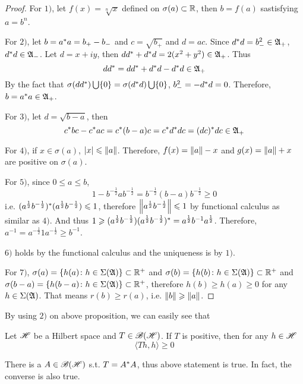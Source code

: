 \documentclass[a4paper,11pt]{report}
\begin{document}
\begin{proof}
	For $1)$, let $f(x)= \sqrt[n]{x}$ defined on $\sigma(a) \subset \mathbb{R}$, then $b=f(a)$ sastisfying $ a = b^{n}$.
	\item For $2)$, let $b = a^{*}a = b_{+} - b_{-}$ and $c = \sqrt{b_{+}}$  and $d=ac$. Since $d^{*}d = b_{-}^2 \in \mathfrak{A}_{+}$, $d^{*}d \in \mathfrak{A}_{-}$. Let $d = x + iy$, then $dd^{*} + d^{*}d = 2(x^2+y^2) \in \mathfrak{A}_{+}$. Thus
	\begin{equation*}
		dd^{*} = dd^{*} + d^{*}d -d^{*}d \in \mathfrak{A}_{+}
	\end{equation*}
	By the fact that $\sigma(dd^{*})\bigcup\{0\} = \sigma(d^{*}d)\bigcup\{0\}$, $b_{-}^2 = -d^{*}d =0$. Therefore, $b = a^{*}a \in \mathfrak{A}_{+}$.
	\item For $3)$, let $d = \sqrt{b-a}$, then 
	\begin{equation*}
		c^{*}bc - c^{*}ac = c^{*}(b-a)c = c^{*}d^{*}dc = (dc)^{*}dc \in \mathfrak{A}_{+}
 	\end{equation*}
 	\item For $4)$, if $x \in \sigma(a)$, $\left\lvert x\right\lvert \leqslant \left\lVert a\right\lVert$. Therefore, $f(x) = \left\lVert a\right\lVert-x$ and $g(x) = \left\lVert a\right\lVert+x$ are positive on $\sigma(a)$.
 	\item For $5)$, since $0 \leqslant a \leqslant b$,
 	\begin{equation*}
 		1-b^{-\frac{1}{2}}ab^{-\frac{1}{2}} = b^{-\frac{1}{2}}(b-a)b^{-\frac{1}{2}} \geqslant 0
 	\end{equation*}
 	i.e. $(a^{\frac{1}{2}} b^{-\frac{1}{2}})^{*}(a^{\frac{1}{2}} b^{-\frac{1}{2}}) \leqslant 1$, therefore $\left\lVert a^{\frac{1}{2}} b^{-\frac{1}{2}}\right\lVert \leqslant 1$ by functional calculus as similar as $4)$. And thus $1 \geqslant (a^{\frac{1}{2}} b^{-\frac{1}{2}})(a^{\frac{1}{2}} b^{-\frac{1}{2}})^{*} = a^{\frac{1}{2}}b^{-1}a^{\frac{1}{2}}$. Therefore, $a^{-1}=a^{-\frac{1}{2}}1a^{-\frac{1}{2}} \geqslant b^{-1}$.
 	\item $6)$ holds by the functional calculus and the uniqueness is by $1)$.
 	\item For $7)$, $\sigma(a) = \{h(a) \colon h \in \Sigma(\mathfrak{A})\} \subset \mathbb{R}^{+}$ and $\sigma(b) = \{h(b) \colon h \in \Sigma(\mathfrak{A})\} \subset \mathbb{R}^{+}$ and $\sigma(b-a) = \{h(b-a) \colon h \in \Sigma(\mathfrak{A})\} \subset \mathbb{R}^{+}$, therefore $h(b) \geqslant h(a) \geqslant 0$ for any $h \in \Sigma(\mathfrak{A})$. That means $r(b) \geqslant r(a)$, i.e. $\left\lVert b\right\lVert \geqslant \left\lVert a\right\lVert$.
\end{proof}

By using $2)$ on above proposition, we can easily see that
\begin{cor} \label{cor7}
	Let $\mathscr{H}$ be a Hilbert space and $T \in \mathscr{B(H)}$. If $T$ is positive, then for any $h \in \mathscr{H}$
	\begin{equation*}
		\langle Th,h \rangle \geqslant 0
	\end{equation*}
\end{cor}
\begin{rem}
	There is a $A \in \mathscr{B(H)}$ s.t. $T=A^{*}A$, thus above statement is true. In fact, the converse is also true.
\end{rem}
\end{document}
